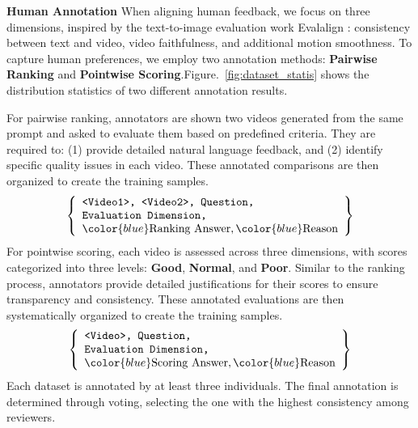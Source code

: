 \vspace{0.5\baselineskip}
\noindent\textbf{Human Annotation}  
When aligning human feedback, we focus on three dimensions, inspired by the text-to-image evaluation work Evalalign \cite{tan2024evalalign}: consistency between text and video, video faithfulness, and additional motion smoothness. To capture human preferences, we employ two annotation methods: \textbf{Pairwise Ranking} and \textbf{Pointwise Scoring}.Figure.~\ref{fig:dataset_statis} shows the distribution statistics of two different annotation results.


For pairwise ranking, annotators are shown two videos generated from the same prompt and asked to evaluate them based on predefined criteria. They are required to: (1) provide detailed natural language feedback, and (2) identify specific quality issues in each video. These annotated comparisons are then organized to create the training samples.
{\small
\[
\left\{
\begin{array}{l}
    \texttt{<Video1>, <Video2>, Question,} \\
    \texttt{Evaluation Dimension,} \\
    {\color{blue} \text{Ranking~Answer}}, {\color{blue} \text{Reason}}
\end{array}
\right\}
\]
}
For pointwise scoring, each video is assessed across three dimensions, with scores categorized into three levels: \textbf{Good}, \textbf{Normal}, and \textbf{Poor}. Similar to the ranking process, annotators provide detailed justifications for their scores to ensure transparency and consistency. These annotated evaluations are then systematically organized to create the training samples.
{\small
\[
\left\{
\begin{array}{l}
    \texttt{<Video>, Question,} \\
    \texttt{Evaluation Dimension,} \\
    {\color{blue} \text{Scoring~Answer}}, {\color{blue} \text{Reason}}
\end{array}
\right\}
\]
}
Each dataset is annotated by at least three individuals. The final annotation is determined through voting, selecting the one with the highest consistency among reviewers.


